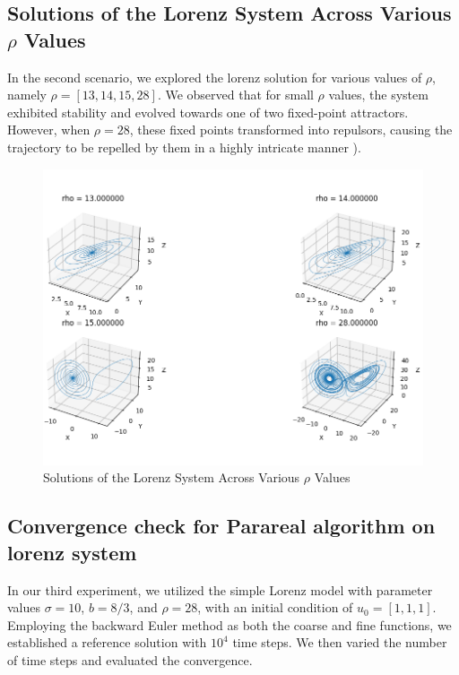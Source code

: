 \documentclass[a4paper,12pt,french]{article}
\begin{document}
\subsection{Solutions of the Lorenz System Across Various $\rho$ Values}
In the second scenario, we explored the lorenz solution for various values of $\rho$, namely $\rho = [13, 14, 15, 28]$. We observed that for small $\rho$ values, the system exhibited stability and evolved towards one of two fixed-point attractors. However, when $\rho = 28$, these fixed points transformed into repulsors, causing the trajectory to be repelled by them in a highly intricate manner ).
\begin{figure}[H]
    \centering
    \includegraphics[width=1.\textwidth]{img/lorenz_rho.png}
    \caption{Solutions of the Lorenz System Across Various $\rho$ Values}
    \label{fig:8}
\end{figure}
\newpage
\subsection{Convergence check for Parareal algorithm on lorenz system}
In our third experiment, we utilized the simple Lorenz model with parameter values \(\sigma = 10\), \(b = 8/3\), and \(\rho = 28\), with an initial condition of \(u_0=[1, 1, 1]\). Employing the backward Euler method as both the coarse and fine functions, we established a reference solution with \(10^4\) time steps. We then varied the number of time steps and evaluated the convergence.
\end{document}
